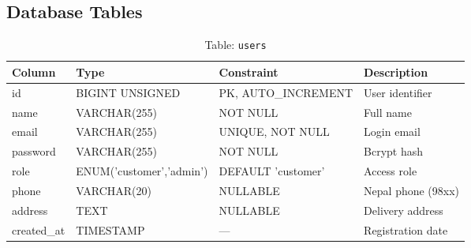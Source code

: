 \documentclass[12pt,a4paper]{report}
\begin{document}
\subsection{Database Tables}

\begin{table}[H]
\centering
\caption{Table: \texttt{users}}
\begin{tabular}{@{}llll@{}}
\toprule
\textbf{Column}   & \textbf{Type}       & \textbf{Constraint}   & \textbf{Description} \\
\midrule
id                & BIGINT UNSIGNED     & PK, AUTO\_INCREMENT   & User identifier \\
name              & VARCHAR(255)        & NOT NULL              & Full name \\
email             & VARCHAR(255)        & UNIQUE, NOT NULL      & Login email \\
password          & VARCHAR(255)        & NOT NULL              & Bcrypt hash \\
role              & ENUM('customer','admin') & DEFAULT 'customer'  & Access role \\
phone             & VARCHAR(20)         & NULLABLE              & Nepal phone (98xx) \\
address           & TEXT                & NULLABLE              & Delivery address \\
created\_at       & TIMESTAMP           & —                     & Registration date \\
\bottomrule
\end{tabular}
\end{table}
\end{document}
